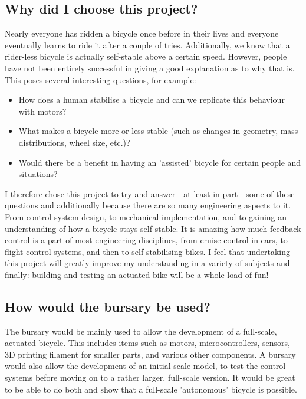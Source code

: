 \documentclass[]{article}
\begin{document}
\subsection{Why did I choose this project?}

Nearly everyone has ridden a bicycle once before in their lives and everyone eventually learns to ride it after a couple of tries. Additionally, we know that a rider-less bicycle is actually self-stable above a certain speed. However, people have not been entirely successful in giving a good explanation as to why that is. This poses several interesting questions, for example:

\begin{itemize}
\item How does a human stabilise a bicycle and can we replicate this behaviour with motors? 
\item What makes a bicycle more or less stable (such as changes in geometry, mass distributions, wheel size, etc.)?
\item Would there be a benefit in having an 'assisted' bicycle for certain people and situations?
\end{itemize}

\noindent I therefore chose this project to try and answer - at least in part - some of these questions and additionally because there are so many engineering aspects to it. From control system design, to mechanical implementation, and to gaining an understanding of how a bicycle stays self-stable. It is amazing how much feedback control is a part of most engineering disciplines, from cruise control in cars, to flight control systems, and then to self-stabilising bikes. I feel that undertaking this project will greatly improve my understanding in a variety of subjects and finally: building and testing an actuated bike will be a whole load of fun!

\subsection{How would the bursary be used?}

The bursary would be mainly used to allow the development of a full-scale, actuated bicycle. This includes items such as motors, microcontrollers, sensors, 3D printing filament for smaller parts, and various other components. A bursary would also allow the development of an initial scale model, to test the control systems before moving on to a rather larger, full-scale version. It would be great to be able to do both and show that a full-scale 'autonomous' bicycle is possible.
\end{document}
